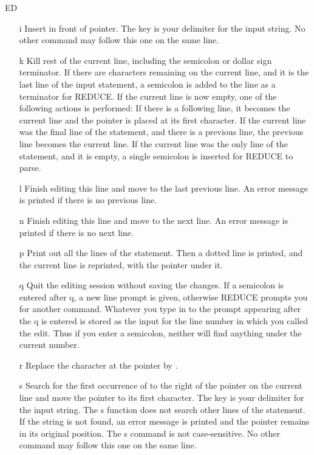 \begin{Command}[ed]{ED}
\begin{itemize}
\item[i\meta{string}\key{ESC}]
Insert  in front of pointer.  The  key is your
delimiter for the input string.  No other command may follow this one on
the same line.

\item[k]
Kill rest of the current line, including the semicolon or dollar sign
terminator.  If there are characters remaining on the current line, and it
is the last line of the input statement, a semicolon is added to the line
as a terminator for REDUCE.  If the current line is now empty, one of the
following actions is performed:  If there is a following line, it becomes
the current line and the pointer is placed at its first character.  If the
current line was the final line of the statement, and there is a previous
line, the previous line becomes the current line.  If the current line was
the only line of the statement, and it is empty, a single semicolon is
inserted for REDUCE to parse.

\item[l]
Finish editing this line and move to the last previous line.  An error message
is printed if there is no previous line.

\item[n]
Finish editing this line and move to the next line.  An error message is 
printed if there is no next line.

\item[p]
Print out all the lines of the statement.  Then a dotted line is printed, and
the current line is reprinted, with the pointer under it.

\item[q]
Quit the editing session without saving the changes.  If a semicolon is
entered after q, a new line prompt is given, otherwise REDUCE prompts you
for another command.  Whatever you type in to the prompt appearing after
the q is entered is stored as the input for the line number in which you
called the edit.  Thus if you enter a semicolon, neither 
 will find anything under the current number.

\item[r\meta{char}]
Replace the character at the pointer by .

\item[s\meta{string}\key{ESC}]
Search for the first occurrence of  to the right of the
pointer on the current line and move the pointer to its first character.
The  key is your delimiter for the input string.  The s function
does not search other lines of the statement.  If the string is not found,
an error message is printed and the pointer remains in its original
position.  The s command is not case-sensitive.  No other command may
follow this one on the same line.


\end{itemize}
\end{Command}
